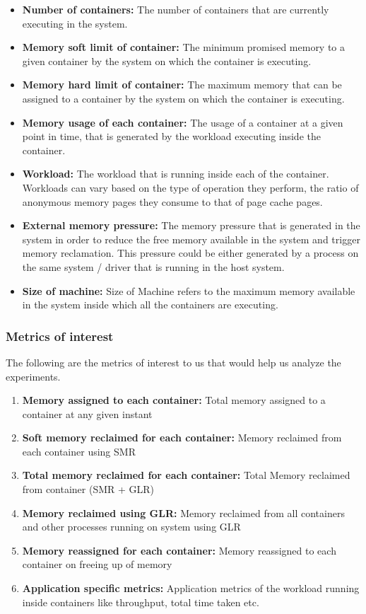 	\begin{itemize}
	  \item \textbf{Number of containers:} The number of containers that are currently executing in the system.
	  \item \textbf{Memory soft limit of container:} The minimum promised memory to a given container by the system on which the 
    container is executing.
	  \item \textbf{Memory hard limit of container:} The maximum memory that can be assigned to a container by the system on which the 
    container is executing.
	  \item \textbf{Memory usage of each container:} The usage of a container at a given point in time, that is generated by the workload 
    executing inside the container.
	  \item \textbf{Workload:} The workload that is running inside each of the container. Workloads can vary based on the type of operation 
    they perform, the ratio of anonymous memory pages they consume to that of page cache pages.  
	  \item \textbf{External memory pressure:} The memory pressure that is generated in the system in order to reduce the free memory 
    available in the system and trigger memory reclamation. This pressure could be either generated by a process on the same system / driver 
    that is running in the host system.
	  \item \textbf{Size of machine:} Size of Machine refers to the maximum memory available in the system inside which all the 
    containers are executing.      
	\end{itemize}  
      
      \subsubsection{Metrics of interest}
      
	The following are the metrics of interest to us that would help us analyze the experiments.
	  
	    \begin{enumerate}
	    \item \textbf{Memory assigned to each container:} Total memory assigned to a container at any given instant
	    \item \textbf{Soft memory reclaimed for each container:} Memory reclaimed from each container using SMR
	    \item \textbf{Total memory reclaimed for each container:} Total Memory reclaimed from container (SMR + GLR)
	    \item \textbf{Memory reclaimed using GLR:} Memory reclaimed from all containers and other processes running on system using GLR
	    \item \textbf{Memory reassigned for each container:} Memory reassigned to each container on freeing up of memory
	    \item \textbf{Application specific metrics:} Application metrics of the workload running inside containers like throughput, total 
    time taken etc.
	    \end{enumerate}
      
